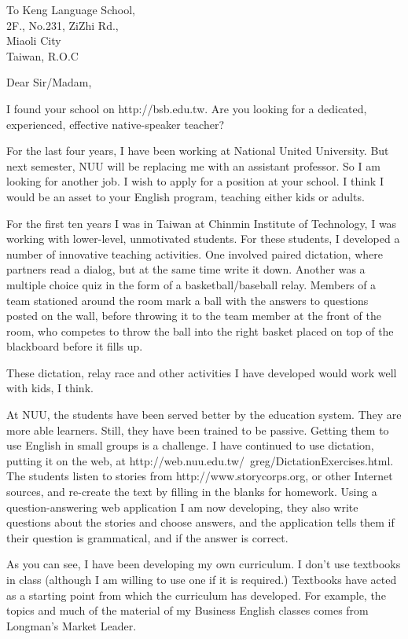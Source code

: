\documentclass{letter}
\begin{document}
\begin{letter}{
To Keng Language School,\\ 2F., No.231, ZiZhi Rd.,\\ Miaoli City\\ Taiwan, R.O.C}
\opening{Dear Sir/Madam,}

I found your school on http://bsb.edu.tw. Are you looking for a dedicated, experienced, effective native-speaker teacher?

For the last four years, I have been working at National United University. But next semester, NUU will be replacing me with an assistant professor. So I am looking for another job. I wish to apply for a position at your school. I think I would be an asset to your English program, teaching either kids or adults.

For the first ten years I was in Taiwan at Chinmin Institute of Technology, I was working with lower-level, unmotivated students. For these students, I developed a number of innovative teaching activities. One involved paired dictation, where partners read a dialog, but at the same time write it down. Another was a multiple choice quiz in the form of a basketball/baseball relay. Members of a team stationed around the room mark a ball with the answers to questions posted on the wall, before throwing it to the team member at the front of the room, who competes to throw the ball into the right basket placed on top of the blackboard before it fills up.

These dictation, relay race and other activities I have developed would work well with kids, I think.

At NUU, the students have been served better by the education system. They are more able learners. Still, they have been trained to be passive. Getting them to use English in small groups is a challenge. I have continued to use dictation, putting it on the web, at http://web.nuu.edu.tw/~greg/DictationExercises.html. The students listen to stories from http://www.storycorps.org, or other Internet sources, and re-create the text by filling in the blanks for homework. Using a question-answering web application I am now developing, they also write questions about the stories and choose answers, and the application tells them if their question is grammatical, and if the answer is correct.

As you can see, I have been developing my own curriculum. I don't use textbooks in class (although I am willing to use one if it is required.) Textbooks have acted as a starting point from which the curriculum has developed. For example, the topics and much of the material of my Business English classes comes from Longman's Market Leader.
 

\end{letter}
\end{document}
